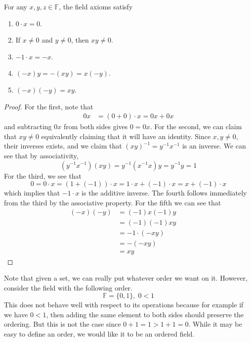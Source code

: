   \begin{lemma}
    For any $x, y, z \in \mathbb{F}$, the field axioms satisfy 
    \begin{enumerate}
      \item $0 \cdot x = 0$.
      \item If $x \neq 0$ and $y \neq 0$, then $x y \neq 0$.
      \item $-1 \cdot x = -x$. 
      \item $(-x) y = - (xy) = x (-y)$. 
      \item $(-x) (-y) = xy$. 
    \end{enumerate}
  \end{lemma} 
  \begin{proof}
    For the first, note that 
    \begin{align}
      0 x & = (0 + 0) \cdot x = 0 x + 0x 
    \end{align}
    and subtracting $0x$ from both sides gives $0 = 0x$. For the second, we can claim that $xy \neq 0$ equivalently claiming that it will have an identity. Since $x, y \neq 0$, their inverses exists, and we claim that $(xy)^{-1} = y^{-1} x^{-1}$ is an inverse. We can see that by associativity, 
    \begin{equation}
      (y^{-1} x^{-1}) (xy) = y^{-1} (x^{-1} x) y = y^{-1} y = 1
    \end{equation} 
    For the third, we see that 
    \begin{equation}
      0 = 0 \cdot x = (1 + (-1)) \cdot x = 1 \cdot x + (-1) \cdot x = x + (-1) \cdot x 
    \end{equation}
    which implies that $-1 \cdot x$ is the additive inverse. The fourth follows immediately from the third by the associative property. For the fifth we can see that 
    \begin{align}
      (-x) (-y) & = (-1) x (-1) y && \tag{property 3} \\
                & = (-1) (-1) x y && \tag{$\times$ is commutative} \\
                & = -1 \cdot (-xy) && \tag{property 3} \\
                & = -(-xy) && \tag{property 3} \\
                & = xy && \tag{addition property 4}
    \end{align}
  \end{proof}

  Note that given a set, we can really put whatever order we want on it. However, consider the field with the following order. 
  \begin{equation}
    \mathbb{F} = \{0, 1\}, \; 0 < 1
  \end{equation} 
  This does not behave well with respect to its operations because for example if we have $0 < 1$, then adding the same element to both sides should preserve the ordering. But this is not the case since $0 + 1 = 1 > 1 + 1 = 0$. While it may be easy to define an order, we would like it to be an ordered field. 

